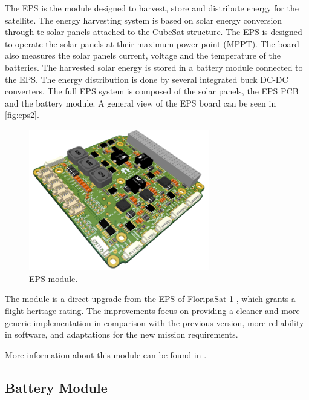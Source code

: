 The EPS is the module designed to harvest, store and distribute energy for the satellite. The energy harvesting system is based on solar energy conversion through te solar panels attached to the CubeSat structure. The EPS is designed to operate the solar panels at their maximum power point (MPPT). The board also measures the solar panels current, voltage and the temperature of the batteries. The harvested solar energy is stored in a battery module connected to the EPS. The energy distribution is done by several integrated buck DC-DC converters. The full EPS system is composed of the solar panels, the EPS PCB and the battery module. A general view of the EPS board can be seen in \autoref{fig:eps2}.

\begin{figure}[!ht]
    \begin{center}
        \includegraphics[width=0.7\textwidth]{figures/eps2-pcb-3d}
        \caption{EPS module.}
        \label{fig:eps2}
    \end{center}
\end{figure}

The module is a direct upgrade from the EPS of FloripaSat-1 \cite{floripasat}, which grants a flight heritage rating. The improvements focus on providing a cleaner and more generic implementation in comparison with the previous version, more reliability in software, and adaptations for the new mission requirements.

More information about this module can be found in \cite{eps2}.

\subsection{Battery Module} \label{ssec:battery-module}

